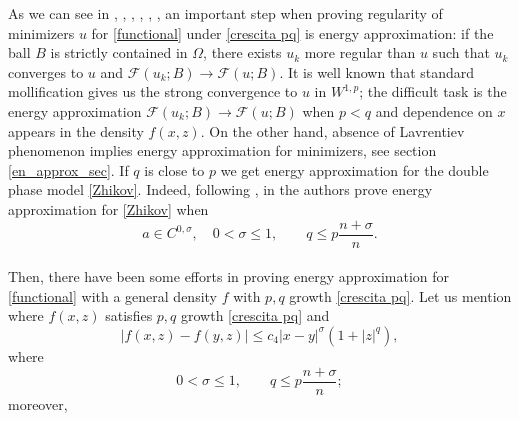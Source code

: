 \documentclass[a4paper,10pt]{article}
\theoremstyle{plain}
\theoremstyle{definition}
\numberwithin{equation}{section} \makeatletter
\begin{document}
\noindent
As we can see in \cite{EspLeoMin-2004}, \cite{DeFilippis-Mingione}, \cite{Koch}, 
\cite{DeFilippis-Mingione-Arch2023}, \cite{DeFilippis-Piccinini}, \cite{DDP}, an important step when proving regularity of minimizers $u$ for \eqref{functional} under \eqref{crescita pq} is energy approximation: if the ball $B$ is strictly contained in $\Omega$, there exists $u_k$ more regular than $u$ such that $u_k$ converges to $u$ and $\mathcal{F}(u_k;B) \rightarrow \mathcal{F}(u;B)$. 
It is well known that standard mollification gives us the strong convergence to $u$ in $W^{1,p}$; the difficult task is the energy approximation  $\mathcal{F}(u_k;B) \rightarrow \mathcal{F}(u;B)$ when $p<q$  
and dependence on $x$ appears in the density $f(x,z)$. 
On the other hand, absence of 
Lavrentiev phenomenon implies energy approximation for minimizers, see section \ref{en_approx_sec}. 
If $q$ is close to $p$ we get energy approximation for the double phase model \eqref{Zhikov}. {
Indeed, following \cite{Zhikov}, in \cite{EspLeoMin-2004} the authors prove} 
energy approximation 
for \eqref{Zhikov} when 
\begin{equation}\label{sigma holder}
    a \in C^{0,\sigma}, \quad 0<\sigma\le 1, \qquad q \le p\frac{n+ \sigma}{n}.
\end{equation} 
\\
Then, there have been some efforts in proving energy approximation for \eqref{functional} with a general density $f$ with $p,q$ growth \eqref{crescita pq}. Let us mention \cite{Esposito-Leonetti-Petricca} where $f(x,z)$ satisfies $p,q$ growth \eqref{crescita pq} and 
\begin{equation}\label{Es-Leo-Petr holder}
   |f(x,z)-f(y,z)|\le c_4|x-y|^\sigma(1+|z|^q),
\end{equation} 
where
\begin{equation}\label{Es-Leo-Petr sigma}
0<\sigma\le 1, \qquad q \le p\frac{n+ \sigma}{n};
\end{equation}
moreover, 
\end{document}

